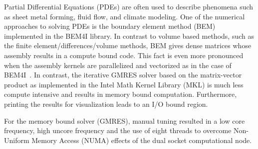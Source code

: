 Partial Differential Equations (PDEs) are often used to describe phenomena such as sheet metal forming, fluid flow, and climate modeling. One of the numerical approaches to solving PDEs is the boundary element method (BEM) implemented in the BEM4I library. In contrast to volume based methods, such as the finite element/differences/volume methods, BEM gives dense matrices whose assembly results in a compute bound code. This fact is even more pronounced when the assembly kernels are parallelized and vectorized as in the case of BEM4I~\cite{ch6_ZapMerMal2016,ch6_MerZapJar2016}. In contrast, the iterative GMRES solver based on the matrix-vector product as implemented in the Intel Math Kernel Library (MKL) is much less compute intensive and results in memory bound computation. Furthermore, printing the results for visualization leads to an I/O bound region. 

For the memory bound solver (GMRES), manual tuning resulted in a low core frequency, high uncore frequency and the use of eight threads to overcome Non-Uniform Memory Access (NUMA) effects of the dual socket computational node. 


